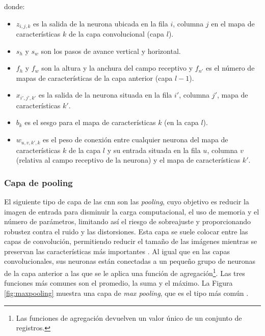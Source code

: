 donde:
\begin{itemize}
    \item \( z_{i,j,k} \) es la salida de la neurona ubicada en la fila \(i\), columna \(j\) en el mapa de características \(k\) de la capa convolucional (capa \(l\)).
    \item \( s_h \) y \( s_w \) son los pasos de avance vertical y horizontal.
    \item \( f_h \) y \( f_w \) son la altura y la anchura del campo receptivo y \( f_{n'} \) es el número de mapas de características de la capa anterior (capa \(l-1\)).
    \item \( x_{i',j',k'} \) es la salida de la neurona situada en la fila \(i'\), columna \(j'\), mapa de características \(k'\).
    \item \( b_k \) es el sesgo para el mapa de características \(k\) (en la capa \(l\)).
    \item \( w_{u,v,k',k} \) es el peso de conexión entre cualquier neurona del mapa de características \(k\) de la capa \(l\) y su entrada situada en la fila \(u\), columna \(v\) (relativa al campo receptivo de la neurona) y el mapa de características \(k'\).
\end{itemize}





\subsubsection*{Capa de pooling}

El siguiente tipo de capa de las \acrshort{cnn} son las \textit{pooling}, cuyo objetivo es reducir la imagen de entrada para disminuir la carga computacional, el uso de memoria y el número de parámetros, limitando así el riesgo de sobreajuste y proporcionando robustez contra el ruido y las distorsiones. Esta capa se suele colocar entre las capas de convolución, permitiendo reducir el tamaño de las imágenes mientras se preservan las características más importantes \citep{podder2021artificial}. Al igual que en las capas convolucionales, sus neuronas están conectadas a un pequeño grupo de neuronas de la capa anterior a las que se le aplica una función de agregación\footnote{Las funciones de agregación devuelven un valor único de un conjunto de registros.}. Las tres funciones más comunes son el promedio, la suma y el máximo. La Figura \ref{fig:maxpooling} muestra una capa de \textit{max pooling}, que es el tipo más común \citep{geron2022hands}. 



